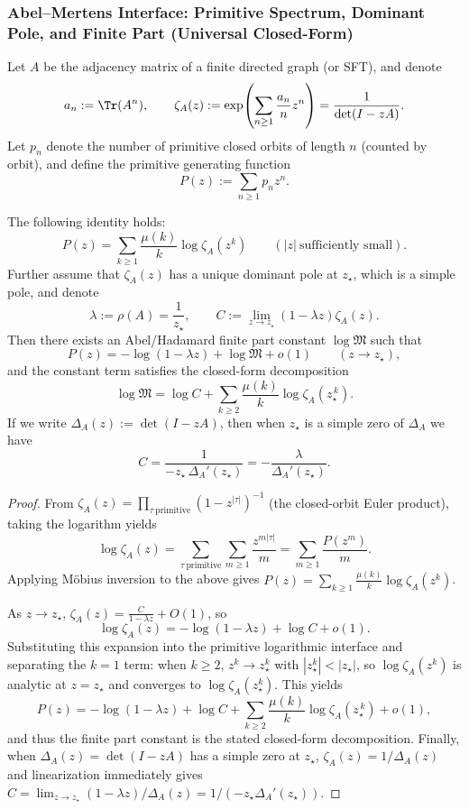 \subsubsection{Abel--Mertens Interface: Primitive Spectrum, Dominant Pole, and Finite Part (Universal Closed-Form)}\label{app:abel-mertens-universal}
Let $A$ be the adjacency matrix of a finite directed graph (or SFT), and denote
\[
a_n:=\Tr(A^n),\qquad
\zeta_A(z):=\exp\!\left(\sum_{n\ge 1}\frac{a_n}{n}z^n\right)=\frac{1}{\det(I-zA)}.
\]
Let $p_n$ denote the number of primitive closed orbits of length $n$ (counted by orbit), and define the primitive generating function
\[
P(z):=\sum_{n\ge 1}p_n z^n.
\]

\begin{theorem}\label{thm:abel-mertens-universal}
The following identity holds:
\[
P(z)=\sum_{k\ge 1}\frac{\mu(k)}{k}\log\zeta_A(z^k)
\qquad(|z|\ \text{sufficiently small}).
\]
Further assume that $\zeta_A(z)$ has a unique dominant pole at $z_\star$, which is a simple pole, and denote
\[
\lambda:=\rho(A)=\frac{1}{z_\star},
\qquad
C:=\lim_{z\to z_\star}(1-\lambda z)\zeta_A(z).
\]
Then there exists an Abel/Hadamard finite part constant $\log\mathfrak{M}$ such that
\[
P(z)=-\log(1-\lambda z)+\log\mathfrak{M}+o(1)\qquad(z\to z_\star),
\]
and the constant term satisfies the closed-form decomposition
\[
\log\mathfrak{M}
=\log C+\sum_{k\ge 2}\frac{\mu(k)}{k}\log\zeta_A(z_\star^{\,k}).
\]
If we write $\Delta_A(z):=\det(I-zA)$, then when $z_\star$ is a simple zero of $\Delta_A$ we have
\[
C=\frac{1}{-z_\star\,\Delta_A'(z_\star)}=-\frac{\lambda}{\Delta_A'(z_\star)}.
\]
\end{theorem}

\begin{proof}
From $\zeta_A(z)=\prod_{\tau\ \mathrm{primitive}}(1-z^{|\tau|})^{-1}$ (the closed-orbit Euler product), taking the logarithm yields
\[
\log\zeta_A(z)=\sum_{\tau\ \mathrm{primitive}}\sum_{m\ge 1}\frac{z^{m|\tau|}}{m}
=\sum_{m\ge 1}\frac{P(z^m)}{m}.
\]
Applying M\"obius inversion to the above gives
\(
P(z)=\sum_{k\ge 1}\frac{\mu(k)}{k}\log\zeta_A(z^k)
\).

As $z\to z_\star$, $\zeta_A(z)=\frac{C}{1-\lambda z}+O(1)$, so
\[
\log\zeta_A(z)=-\log(1-\lambda z)+\log C+o(1).
\]
Substituting this expansion into the primitive logarithmic interface and separating the $k=1$ term: when $k\ge 2$, $z^k\to z_\star^k$ with $|z_\star^k|<|z_\star|$,
so $\log\zeta_A(z^k)$ is analytic at $z=z_\star$ and converges to $\log\zeta_A(z_\star^k)$. This yields
\[
P(z)=-\log(1-\lambda z)+\log C+\sum_{k\ge 2}\frac{\mu(k)}{k}\log\zeta_A(z_\star^{\,k})+o(1),
\]
and thus the finite part constant is the stated closed-form decomposition.
Finally, when $\Delta_A(z)=\det(I-zA)$ has a simple zero at $z_\star$,
\(
\zeta_A(z)=1/\Delta_A(z)
\)
and linearization immediately gives
\(
C=\lim_{z\to z_\star}(1-\lambda z)/\Delta_A(z)=1/(-z_\star\Delta_A'(z_\star))
\).
\end{proof}


